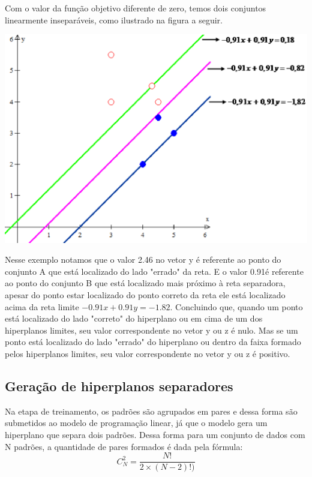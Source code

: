 \begin{itemize}
Com o valor da função objetivo diferente de zero, temos dois conjuntos linearmente inseparáveis, como ilustrado na figura a seguir.

\begin{center}
	\includegraphics[scale=0.5]{graficos/exemplo1}
	\label{img:ex2}
\end{center}

Nesse exemplo notamos que o valor 2.46 no vetor y é referente ao ponto do conjunto A que está localizado do lado "errado" da reta. E o valor 0.91é referente ao ponto do conjunto B que está localizado mais próximo à reta separadora, apesar do ponto estar localizado do ponto correto da reta ele está localizado acima da reta limite $-0.91x + 0.91y = -1.82$. Concluindo que, quando um ponto está localizado do lado "correto" do hiperplano ou em cima de um dos hiperplanos limites, seu valor correspondente no vetor y ou z é nulo. Mas se um ponto está localizado do lado "errado" do hiperplano ou dentro da faixa formado pelos hiperplanos limites, seu valor correspondente no vetor y ou z é positivo.
\end{itemize}

\subsection{Geração de hiperplanos separadores}
Na etapa de treinamento, os padrões são agrupados em pares e dessa forma são submetidos ao modelo de programação linear, já que o modelo gera um hiperplano que separa dois padrões. Dessa forma para um conjunto de dados com N padrões, a quantidade de pares formados é dada pela fórmula:
$$ C_{N}^{2}=\frac{N!}{2\times (N-2)!)} $$

